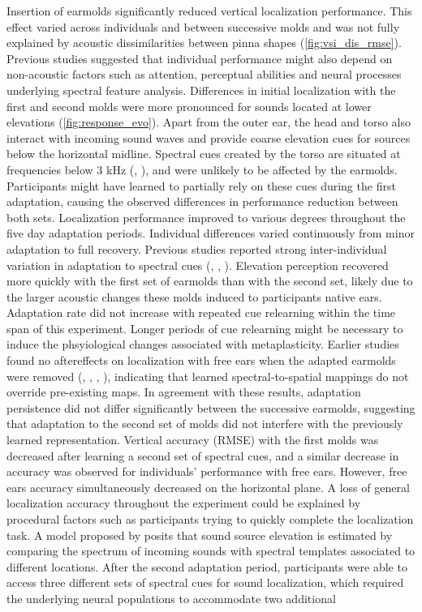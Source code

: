 Insertion of earmolds significantly reduced vertical localization performance. This effect varied across individuals and between successive molds and was not fully explained by acoustic dissimilarities between pinna shapes (\cref{fig:vsi_dis_rmse}). Previous studies suggested that individual performance might also depend on non-acoustic factors such as attention, perceptual abilities and neural processes underlying spectral feature analysis. Differences in initial localization with the first and second molds were more pronounced for sounds located at lower elevations (\cref{fig:response_evo}). Apart from the outer ear, the head and torso also interact with incoming sound waves and provide coarse elevation cues for sources below the horizontal midline. Spectral cues created by the torso are situated at frequencies below 3 kHz (\citet{asano_role_1990}, \citet{algazi_elevation_2001}), and were unlikely to be affected by the earmolds. Participants might have learned to partially rely on these cues during the first adaptation, causing the observed differences in performance reduction between both sets. Localization performance improved to various degrees throughout the five day adaptation periods. Individual differences varied continuously from minor adaptation to full recovery. Previous studies reported strong inter-individual variation in adaptation to spectral cues (\citet{hofman_relearning_1998}, \citet{wanrooij_relearning_2005}, \citet{trapeau_fast_2016}). Elevation perception recovered more quickly with the first set of earmolds than with the second set, likely due to the larger acoustic changes these molds induced to participants native ears. Adaptation rate did not increase with repeated cue relearning within the time span of this experiment. Longer periods of cue relearning might be necessary to induce the phsyiological changes associated with metaplasticity. Earlier studies found no aftereffects on localization with free ears when the adapted earmolds were removed (\citet{carlile_relearning_2014}, \citet{hofman_relearning_1998}, \citet{trapeau_fast_2016}, \citet{wanrooij_relearning_2005}), indicating that learned spectral-to-spatial mappings do not override pre-existing maps. In agreement with these results, adaptation persistence did not differ significantly between the successive earmolds, suggesting that adaptation to the second set of molds did not interfere with the previously learned representation. Vertical accuracy (RMSE) with the first molds was decreased after learning a second set of spectral cues, and a similar decrease in accuracy was observed for individuals' performance with free ears. However, free ears accuracy simultaneously decreased on the horizontal plane. A loss of general localization accuracy throughout the experiment could be explained by procedural factors such as participants trying to quickly complete the localization task. A model proposed by \citet{hofman_spectro-temporal_1998} posits that sound source elevation is estimated by comparing the spectrum of incoming sounds with spectral templates associated to different locations. After the second adaptation period, participants were able to access three different sets of spectral cues for sound localization, which required the underlying neural populations to accommodate two additional 